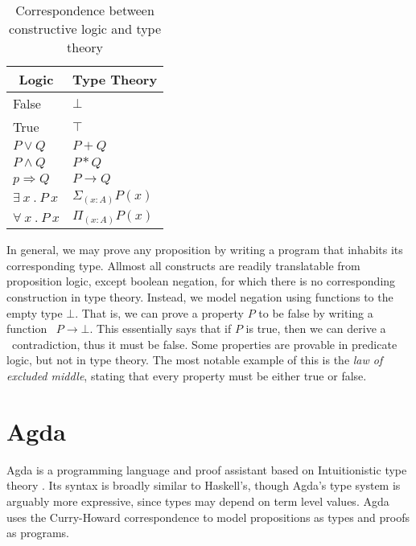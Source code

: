 \documentclass[a4paper,msc,twosized=semi]{uustthesis}
\let\oldemph\emph
\renewcommand\emph[1]{{\large\oldemph{#1}}}
\begin{document}
\begin{table}[h]
\begin{center}\begin{framed}
\begin{tabular}{ll}
\multicolumn{1}{c}{\textbf{Logic}} & \textbf{Type Theory} \\ \hline \hline
False                                        & $\bot$               \\
True                                         & $\top$               \\
$P \vee Q$                                   & $P + Q$              \\
$P \wedge Q$                                 & $P * Q$              \\
$p \Rightarrow Q$                            & $P \rightarrow Q$    \\
$\exists\ x\ .\ P\ x$                        & $\Sigma_{(x : A)} P(x)$ \\
$\forall\ x\ .\ P\ x$                        & $\Pi_{(x : A)} P(x)$                   
\end{tabular}
\caption{Correspondence between constructive logic and type theory}
\label{tbl:chiso}
\end{framed}\end{center}
\end{table}

  In general, we may prove any proposition by writing a program that inhabits its 
  corresponding type. Allmost all constructs are readily translatable 
  from proposition logic, except boolean negation, for which there is no corresponding 
  construction in type theory. Instead, we model negation using functions to the empty 
  type $\bot$. That is, we can prove a property $P$ to be false by writing a function \
  $P \rightarrow \bot$. This essentially says that if $P$ is true, then we can derive a \
  contradiction, thus it must be false. Some properties are 
  provable in predicate logic, but not in type theory. The most notable example of this 
  is the \emph{law of excluded middle}, stating that every property must be either true 
  or false. 

\section{Agda}

  Agda is a programming language and proof assistant based on Intuitionistic type theory \cite
  {norell2008dependently}. Its syntax is broadly similar to Haskell's, though Agda's 
  type system is arguably more expressive, since types may depend on term level 
  values. Agda uses the Curry-Howard correspondence to model propositions as types 
  and proofs as programs. 
\end{document}
